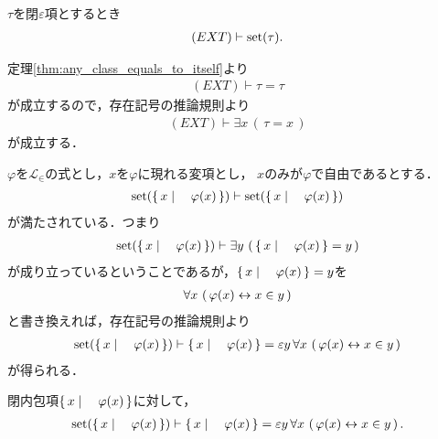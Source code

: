 	\begin{screen}
		\begin{thm}
			$\tau$を閉$\varepsilon$項とするとき
			\begin{align}
				(EXT) \vdash \operatorname*{set} (\tau).
			\end{align}
		\end{thm}
	\end{screen}
	
	\begin{sketch}
		定理\ref{thm:any_class_equals_to_itself}より
		\begin{align}
			(EXT) \vdash \tau = \tau
		\end{align}
		が成立するので，存在記号の推論規則より
		\begin{align}
			(EXT) \vdash \exists x\, \left(\, \tau = x\, \right)
		\end{align}
		が成立する．
		\QED
	\end{sketch}
	
	$\varphi$を$\mathcal{L}_{\in}$の式とし，$x$を$\varphi$に現れる変項とし，
	$x$のみが$\varphi$で自由であるとする．
	\begin{align}
		\operatorname*{set} (\left\{\, x \mid \quad \varphi(x)\, \right\}) \vdash \operatorname*{set} (\left\{\, x \mid \quad \varphi(x)\, \right\})
	\end{align}
	が満たされている．つまり
	\begin{align}
		\operatorname*{set} (\left\{\, x \mid \quad \varphi(x)\, \right\}) 
		\vdash \exists y\, \left(\, \left\{\, x \mid \quad \varphi(x)\, \right\} = y\, \right)
	\end{align}
	が成り立っているということであるが，$\left\{\, x \mid \quad \varphi(x)\, \right\} = y$を
	\begin{align}
		\forall x\, \left(\, \varphi(x) \leftrightarrow x \in y\, \right)
	\end{align}
	と書き換えれば，存在記号の推論規則より
	\begin{align}
		\operatorname*{set} (\left\{\, x \mid \quad \varphi(x)\, \right\}) \vdash \left\{\, x \mid \quad \varphi(x)\, \right\} = 
		\varepsilon y\, \forall x\, \left(\, \varphi(x) \leftrightarrow x \in y\, \right)
	\end{align}
	が得られる．
	
	\begin{screen}
		\begin{thm}
			閉内包項$\left\{\, x \mid \quad \varphi(x)\, \right\}$に対して，
			\begin{align}
				\operatorname*{set} (\left\{\, x \mid \quad \varphi(x)\, \right\}) \vdash \left\{\, x \mid \quad \varphi(x)\, \right\} 
				= \varepsilon y\, \forall x\, \left(\, \varphi(x) \leftrightarrow x \in y\, \right).
			\end{align}
		\end{thm}
	\end{screen}
	
